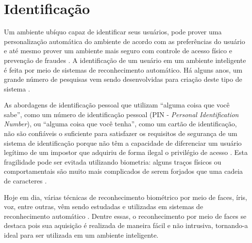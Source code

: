 	
	

	

\section{Identificação}
	
	Um ambiente ubíquo capaz de identificar seus usuários, pode prover uma
	personalização automática do ambiente de acordo com as preferências do usuário e
	até mesmo prover um ambiente mais seguro com controle de acesso físico e
	prevenção de fraudes \cite{saocarlos}. A identificação de um usuário em um
	ambiente inteligente é feita por meio de sistemas de reconhecimento automático.
	Há alguns anos, um grande número de pesquisas vem sendo desenvolvidas para criação
	deste tipo de sistema  \cite{saocarlos}.
	
	As abordagens de identificação pessoal que utilizam ``alguma coisa que você
	sabe'', como um número de identificação pessoal (PIN - \textit{Personal
	Identification Number}), ou ``alguma coisa que você tenha'', como um cartão de identificação,
	não são confiáveis o suficiente para satisfazer os requisitos de segurança de um
	sistema de identificação porque não têm a capacidade de diferenciar um usuário
	legítimo de um impostor que adquiriu de forma ilegal o privilégio de acesso
	\cite{hong}. Esta fragilidade pode ser evitada utilizando biometria: alguns
	traços físicos ou comportamentais são muito mais complicados de serem forjados
	que uma cadeia de caracteres \cite{drovetto}.
	
	Hoje em dia, várias técnicas de reconhecimento biométrico por meio de faces,
	íris, voz, entre outras, vêm sendo estudadas e utilizadas em sistemas de
	reconhecimento automático \cite{bolle}. Dentre essas, o reconhecimento por meio
	de faces se destaca pois sua aquisição é realizada de maneira fácil e não
	intrusiva, tornando-a ideal para ser utilizada em um ambiente inteligente.
	


	
	






























